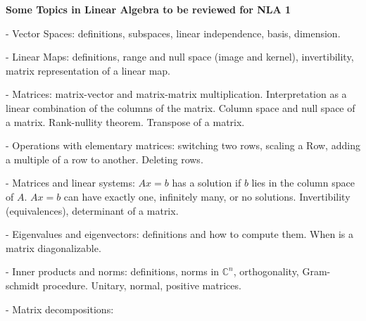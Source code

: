 \documentclass[11pt]{report}
\begin{document}
\textbf{{Some Topics in Linear Algebra to be reviewed for NLA 1}}\\
\thispagestyle{empty}


- Vector Spaces: definitions, subspaces, linear independence, basis, dimension.

- Linear Maps: definitions, range and null space (image and kernel), invertibility, matrix representation of a linear map.

- Matrices: matrix-vector and matrix-matrix multiplication. Interpretation as a linear combination of the columns of the matrix. Column space and null space of a matrix. Rank-nullity theorem. Transpose of a matrix.

- Operations with elementary matrices: switching two rows, scaling a Row, adding a multiple of a row to another. Deleting rows.

- Matrices and linear systems: 
$Ax=b$ has a solution if $b$ lies in the column space of $A$.
$Ax=b$ can have exactly one, infinitely many, or no solutions.
Invertibility (equivalences), determinant of a matrix.

- Eigenvalues and eigenvectors: 
definitions and how to compute them. When is a matrix diagonalizable.

- Inner products and norms: definitions, norms in $\mathbb{C}^n$, orthogonality, Gram-schmidt procedure. Unitary, normal, positive matrices.

- Matrix decompositions:
\end{document}
